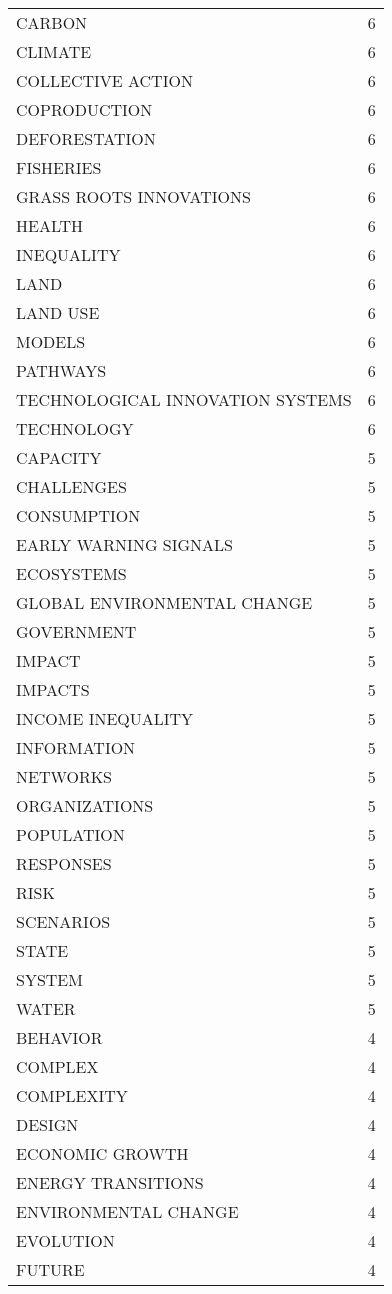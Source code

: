 \documentclass[]{article}
\begin{document}
\begin{longtable}{lc}
CARBON & 6 \\ 
CLIMATE & 6 \\ 
COLLECTIVE ACTION & 6 \\ 
COPRODUCTION & 6 \\ 
DEFORESTATION & 6 \\ 
FISHERIES & 6 \\ 
GRASS ROOTS INNOVATIONS & 6 \\ 
HEALTH & 6 \\ 
INEQUALITY & 6 \\ 
LAND & 6 \\ 
LAND USE & 6 \\ 
MODELS & 6 \\ 
PATHWAYS & 6 \\ 
TECHNOLOGICAL INNOVATION SYSTEMS & 6 \\ 
TECHNOLOGY & 6 \\ 
CAPACITY & 5 \\ 
CHALLENGES & 5 \\ 
CONSUMPTION & 5 \\ 
EARLY WARNING SIGNALS & 5 \\ 
ECOSYSTEMS & 5 \\ 
GLOBAL ENVIRONMENTAL CHANGE & 5 \\ 
GOVERNMENT & 5 \\ 
IMPACT & 5 \\ 
IMPACTS & 5 \\ 
INCOME INEQUALITY & 5 \\ 
INFORMATION & 5 \\ 
NETWORKS & 5 \\ 
ORGANIZATIONS & 5 \\ 
POPULATION & 5 \\ 
RESPONSES & 5 \\ 
RISK & 5 \\ 
SCENARIOS & 5 \\ 
STATE & 5 \\ 
SYSTEM & 5 \\ 
WATER & 5 \\ 
BEHAVIOR & 4 \\ 
COMPLEX & 4 \\ 
COMPLEXITY & 4 \\ 
DESIGN & 4 \\ 
ECONOMIC GROWTH & 4 \\ 
ENERGY TRANSITIONS & 4 \\ 
ENVIRONMENTAL CHANGE & 4 \\ 
EVOLUTION & 4 \\ 
FUTURE & 4 \\ 

\end{longtable}
\end{document}
